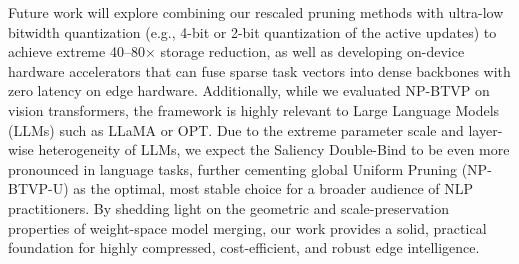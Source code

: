 Future work will explore combining our rescaled pruning methods with ultra-low bitwidth quantization (e.g., 4-bit or 2-bit quantization of the active updates) to achieve extreme 40--80$\times$ storage reduction, as well as developing on-device hardware accelerators that can fuse sparse task vectors into dense backbones with zero latency on edge hardware. Additionally, while we evaluated NP-BTVP on vision transformers, the framework is highly relevant to Large Language Models (LLMs) such as LLaMA or OPT. Due to the extreme parameter scale and layer-wise heterogeneity of LLMs, we expect the Saliency Double-Bind to be even more pronounced in language tasks, further cementing global Uniform Pruning (NP-BTVP-U) as the optimal, most stable choice for a broader audience of NLP practitioners. By shedding light on the geometric and scale-preservation properties of weight-space model merging, our work provides a solid, practical foundation for highly compressed, cost-efficient, and robust edge intelligence.